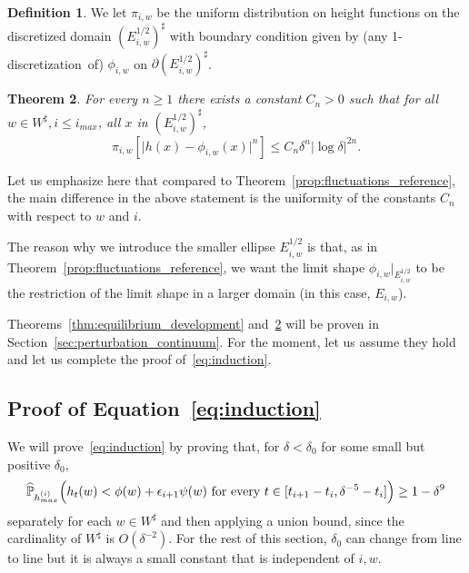 \documentclass[10pt]{amsart}
\newtheorem{theo}{Theorem}[section]
\theoremstyle{definition}\newtheorem{defi}[theo]{Definition}\newtheorem{rema}[theo]{Remark}\newtheorem{exam}[theo]{Example}\newtheorem{exem}[theo]{Example}\newtheorem{nota}[theo]{Notation}
\renewcommand{\P}{\mathbb{P}}
\newcommand{\abs}[1]{\lvert #1 \rvert}
\newcommand{\eps}{\epsilon}
\renewcommand{\d}{{\sharp }}
\let\oldhat\hat
\renewcommand*{\hat}[1]{\mathchoice{\widehat{#1}}{\widehat{#1}}{\oldhat{#1}}{\oldhat{#1}}}
\begin{document}
\begin{defi}\label{piiw}
We let $\pi_{i,w}$ be the uniform distribution on height functions on the discretized domain $(E^{1/2}_{i,w})^\d$ with boundary condition given by (any 1-discretiza\-tion~of) $\phi_{i,w}$ on $\partial (E^{1/2}_{i,w})^\d$.
\end{defi}



\begin{theo}\label{th:letrucdestrentederivees}
For every $n\ge1$ there exists a constant $C_n > 0$ such that for all $w\in W^\d,i\le i_{max}$, all $x$ in $(E^{1/2}_{i,w})^\d$,
\begin{equation}\label{eq:letruc}
\pi_{i,w}\left[\Big| h(x) - \phi_{i,w}(x) \Big|^n\right] \leq C_n \delta^{n} \abs{\log\delta}^{2n}.
\end{equation}
\end{theo}

Let us emphasize here that compared to Theorem~\ref{prop:fluctuations_reference}, the main difference in the above statement is the uniformity of the constants $C_n$ with respect to $w$ and $i$.

The reason why we introduce the smaller ellipse $E^{1/2}_{i,w}$ is that, as in Theorem~\ref{prop:fluctuations_reference}, we want the limit shape $\phi_{i,w}|_{E^{1/2}_{i,w}}$ to be the restriction of the limit shape in a larger domain (in this case, $E_{i,w}$).

Theorems~\ref{thm:equilibrium_development} and~\ref{th:letrucdestrentederivees} will be proven in Section~\ref{sec:perturbation_continuum}. For the moment, let us assume they hold and let us complete the proof of~\eqref{eq:induction}.


\subsection{Proof of Equation~\eqref{eq:induction}}\label{sec:proof52}


We will prove~\eqref{eq:induction} by proving that, for $\delta<\delta_0$ for some small but positive $\delta_0$,
\begin{equation}\label{eq:induction2}
\hat\P_{h^{(i)}_{max}} \Big(h_t(w) < \phi(w) + \eps_{i+1} \psi(w) \text{ for every } t\in [t_{i+1} - t_i, \delta^{-5}- t_i]\Big) \geq 1 - \delta^9
\end{equation}
separately for each $w\in W^\d$ and then applying a union bound, since the cardinality of $W^\d$ is $O(\delta^{-2})$. For the rest of this section, $\delta_0$ can change from line to line but it is always a small constant that is independent of $i,w$.
\end{document}
